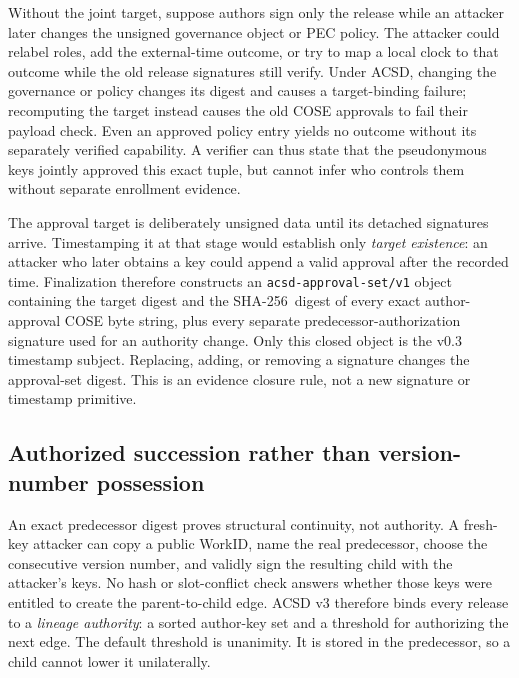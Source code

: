 \documentclass[11pt]{article}
\newcommand{\sha}{\textsf{SHA-256}}
\begin{document}
Without the joint target, suppose authors sign only the release while an
attacker later changes the unsigned governance object or PEC policy. The
attacker could relabel roles, add the external-time outcome, or try to map a
local clock to that outcome while the old release signatures still verify.
Under ACSD, changing the governance or policy changes its digest and causes a
target-binding failure; recomputing the target instead causes the old COSE
approvals to fail their payload check. Even an approved policy entry yields no
outcome without its separately verified capability. A verifier can thus state
that the pseudonymous keys jointly approved this exact tuple, but cannot infer
who controls them without separate enrollment evidence.

The approval target is deliberately unsigned data until its detached
signatures arrive. Timestamping it at that stage would establish only
\emph{target existence}: an attacker who later obtains a key could append a
valid approval after the recorded time. Finalization therefore constructs an
\texttt{acsd-approval-set/v1} object containing the target digest and the
\sha\ digest of every exact author-approval COSE byte string, plus every
separate predecessor-authorization signature used for an authority change.
Only this closed object is the v0.3 timestamp subject. Replacing, adding, or
removing a signature changes the approval-set digest. This is an evidence
closure rule, not a new signature or timestamp primitive.

\subsection{Authorized succession rather than version-number possession}

An exact predecessor digest proves structural continuity, not authority. A
fresh-key attacker can copy a public WorkID, name the real predecessor, choose
the consecutive version number, and validly sign the resulting child with the
attacker's keys. No hash or slot-conflict check answers whether those keys were
entitled to create the parent-to-child edge. ACSD v3 therefore binds every
release to a \emph{lineage authority}: a sorted author-key set and a threshold
for authorizing the next edge. The default threshold is unanimity. It is stored
in the predecessor, so a child cannot lower it unilaterally.
\end{document}
